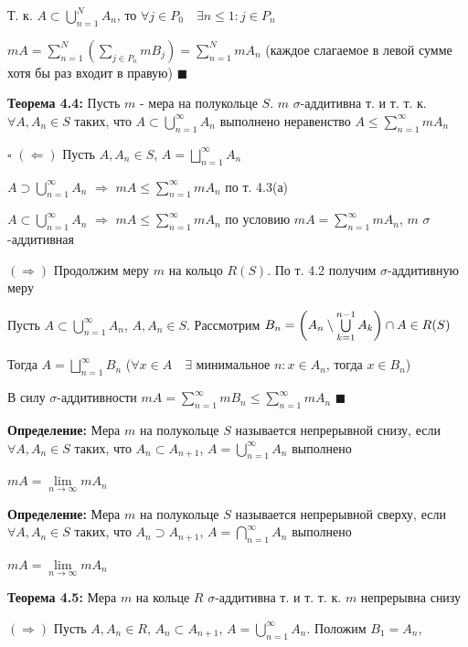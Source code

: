 \documentclass[a4paper]{report}
\newcommand*{\hm}[1]{#1\nobreak\discretionary{}%
            {\hbox{$\mathsurround=0pt #1$}}{}}
\begin{document}
Т. к. $A\subset\bigcup\limits_{n=1}^N A_n$, то $\forall j\in P_0\quad\exists n\le1\colon j\in P_n$

$mA=\sum\limits_{n=1}^N\left(\sum\limits_{j\in P_n}mB_j\right)=\sum\limits_{n=1}^N mA_n$
(каждое слагаемое в левой сумме хотя бы раз входит в правую) $\blacksquare$
\bigskip

\noindent\textbf{Теорема 4.4:} Пусть $m$ - мера на полукольце $S$. $m$ $\sigma$-аддитивна т. и т. т. к. $\forall A,A_n\in S$
таких, что $A\subset\bigcup\limits_{n=1}^\infty A_n$ выполнено неравенство $A\le\sum\limits_{n=1}^\infty mA_n$

\noindent $\square$ $(\Leftarrow)$ Пусть $A,A_n\in S$, $A=\bigsqcup\limits_{n=1}^\infty A_n$

$A\supset\bigcup\limits_{n=1}^\infty A_n$ $\Rightarrow$ $mA\le\sum\limits_{n=1}^\infty mA_n$ по т. 4.3(а)

$A\subset\bigcup\limits_{n=1}^\infty A_n$ $\Rightarrow$ $mA\le\sum\limits_{n=1}^\infty mA_n$ по условию $mA=\sum\limits_{n=1}^\infty
mA_n$, $m$ $\sigma$-аддитивная

$(\Rightarrow)$ Продолжим меру $m$ на кольцо $R(S)$. По т. 4.2 получим $\sigma$-аддитивную меру

Пусть $A\subset\bigcup\limits_{n=1}^\infty A_n$, $A,A_n\in S$. Рассмотрим $B_n=\left(A_n\setminus\bigcup\limits_{k=1}^{n-1}
A_k\right)\cap A\hm\in R(S)$

Тогда $A=\bigsqcup\limits_{n=1}^\infty B_n$ ($\forall x\in A\quad\exists$ минимальное $n\colon x\in A_n$, тогда $x\in B_n$)

В силу $\sigma$-аддитивности $mA=\sum\limits_{n=1}^\infty mB_n\le\sum\limits_{n=1}^\infty mA_n$ $\blacksquare$
\bigskip

\noindent\textbf{Определение:} Мера $m$ на полукольце $S$ называется непрерывной снизу, если $\forall A,A_n\in S$ таких, 
что $A_n\subset A_{n+1}$, $A=\bigcup\limits_{n=1}^\infty A_n$ выполнено 

$mA=\lim\limits_{n\to\infty}mA_n$
\bigskip

\noindent\textbf{Определение:} Мера $m$ на полукольце $S$ называется непрерывной сверху, если $\forall A,A_n\in S$ таких, 
что $A_n\supset A_{n+1}$, $A=\bigcap\limits_{n=1}^\infty A_n$ выполнено 

$mA=\lim\limits_{n\to\infty}mA_n$
\bigskip

\noindent\textbf{Теорема 4.5:} Мера $m$ на кольце $R$ $\sigma$-аддитивна т. и т. т. к. $m$ непрерывна снизу

\noindent $(\Rightarrow)$ Пусть $A,A_n\in R$, $A_n\subset A_{n+1}$, $A=\bigcup\limits_{n=1}^\infty A_n$. Положим $B_1=A_n$,
\end{document}
